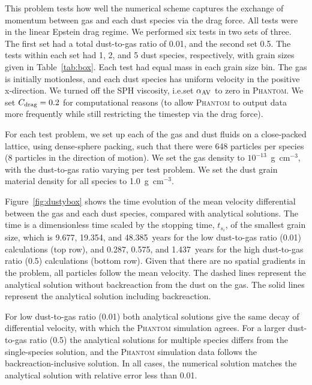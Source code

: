 \documentclass[fleqn,usenatbib]{mnras}
\begin{document}
This problem tests how well the numerical scheme captures the exchange of
momentum between gas and each dust species via the drag force. All tests were in
the linear Epstein drag regime. We performed six tests in two sets of three. The
first set had a total dust-to-gas ratio of 0.01, and the second set 0.5. The
tests within each set had 1, 2, and 5 dust species, respectively, with grain
sizes given in Table~\ref{tab:box}. Each test had equal mass in each grain size
bin. The gas is initially motionless, and each dust species has uniform velocity
in the positive x-direction. We turned off the SPH viscosity, i.e.\@ set
\(\alpha_{\rm AV}\) to zero in \textsc{Phantom}. We set \(C_{\rm drag} = 0.2\)
for computational reasons (to allow \textsc{Phantom} to output data more
frequently while still restricting the timestep via the drag force).

For each test problem, we set up each of the gas and dust fluids on a
close-packed lattice, using dense-sphere packing, such that there were 648
particles per species (8 particles in the direction of motion). We set the gas
density to \(10^{-13}\)~g~cm\({}^{-3}\), with the dust-to-gas ratio varying per
test problem. We set the dust grain material density for all species to
1.0~g~cm\({}^{-3}\).

Figure~\ref{fig:dustybox} shows the time evolution of the mean velocity
differential between the gas and each dust species, compared with analytical
solutions. The time is a dimensionless time scaled by the stopping time,
\(t_{s_i}\), of the smallest grain size, which is 9.677, 19.354, and
48.385~years for the low dust-to-gas ratio (0.01) calculations (top row), and
0.287, 0.575, and 1.437~years for the high dust-to-gas ratio (0.5) calculations
(bottom row). Given that there are no spatial gradients in the problem, all
particles follow the mean velocity. The dashed lines represent the analytical
solution without backreaction from the dust on the gas. The solid lines
represent the analytical solution including backreaction.

For low dust-to-gas ratio (0.01) both analytical solutions give the same decay
of differential velocity, with which the \textsc{Phantom} simulation agrees. For
a larger dust-to-gas ratio (0.5) the analytical solutions for multiple species
differs from the single-species solution, and the \textsc{Phantom} simulation
data follows the backreaction-inclusive solution. In all cases, the numerical
solution matches the analytical solution with relative error less than 0.01.
\end{document}
